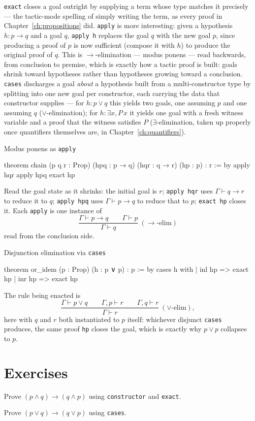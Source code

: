 \texttt{exact} closes a goal outright by supplying a term whose type
matches it precisely — the tactic-mode spelling of simply writing
the term, as every proof in Chapter~\ref{ch:propositions} did.
\texttt{apply} is more interesting: given a hypothesis
$h : p \to q$ and a goal $q$, \texttt{apply h} replaces the goal $q$
with the new goal $p$, since producing a proof of $p$ is now
sufficient (compose it with $h$) to produce the original proof of
$q$. This is $\to$-elimination — modus ponens — read backwards, from
conclusion to premise, which is exactly how a tactic proof is built:
goals shrink toward hypotheses rather than hypotheses growing toward
a conclusion. \texttt{cases} discharges a goal \emph{about} a
hypothesis built from a multi-constructor type by splitting into one
new goal per constructor, each carrying the data that constructor
supplies — for $h : p \lor q$ this yields two goals, one assuming
$p$ and one assuming $q$ ($\lor$-elimination); for $h : \exists x, P\,x$
it yields one goal with a fresh witness variable and a proof that
the witness satisfies $P$ ($\exists$-elimination, taken up properly
once quantifiers themselves are, in Chapter~\ref{ch:quantifiers}).

\begin{experiment}{Modus ponens as \texttt{apply}}
\begin{lean}
theorem chain (p q r : Prop)
    (hpq : p → q) (hqr : q → r) (hp : p) : r := by
  apply hqr
  apply hpq
  exact hp
\end{lean}
Read the goal state as it shrinks: the initial goal is $r$;
\texttt{apply hqr} uses $\Gamma \vdash q \to r$ to reduce it to $q$;
\texttt{apply hpq} uses $\Gamma \vdash p \to q$ to reduce that to
$p$; \texttt{exact hp} closes it. Each \texttt{apply} is one instance
of
\[
\dfrac{\Gamma \vdash p \to q \qquad \Gamma \vdash p}{\Gamma \vdash q}
\ (\to\text{-elim})
\]
read from the conclusion side.
\end{experiment}

\begin{experiment}{Disjunction elimination via \texttt{cases}}
\begin{lean}
theorem or_idem (p : Prop) (h : p ∨ p) : p := by
  cases h with
  | inl hp => exact hp
  | inr hp => exact hp
\end{lean}
The rule being enacted is
\[
\dfrac{\Gamma \vdash p \lor q \qquad \Gamma, p \vdash r
  \qquad \Gamma, q \vdash r}{\Gamma \vdash r}
\ (\lor\text{-elim}),
\]
here with $q$ and $r$ both instantiated to $p$ itself: whichever
disjunct \texttt{cases} produces, the same proof \texttt{hp} closes
the goal, which is exactly why $p \lor p$ collapses to $p$.
\end{experiment}

\section{Exercises}

\begin{exercise}
Prove $(p \land q) \to (q \land p)$ using \texttt{constructor} and
\texttt{exact}.
\end{exercise}

\begin{exercise}
Prove $(p \lor q) \to (q \lor p)$ using \texttt{cases}.
\end{exercise}
